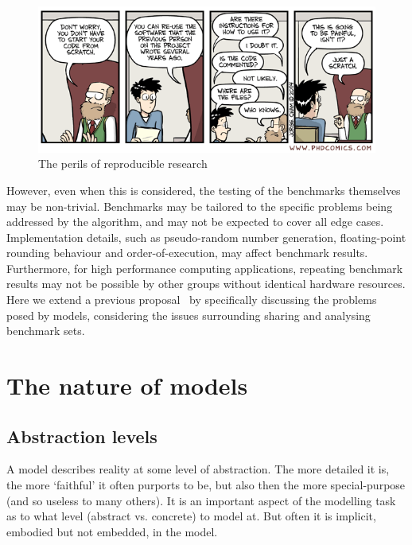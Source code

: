 \documentclass[conference]{IEEEtran}
\begin{document}
\begin{figure}[!ht]
\centering
\includegraphics[width=\columnwidth]{phd031214s.png}
\caption{The perils of reproducible research\newline [credit: \url{http://www.phdcomics.com/comics.php?f=1689}]}
\label{fig:reprodres} 
\end{figure}

However, even when this is considered, the testing of the benchmarks
themselves may be non-trivial. Benchmarks may be tailored to the
specific problems being addressed by the algorithm, and may not be
expected to cover all edge cases. Implementation details, such as
pseudo-random number generation, floating-point rounding behaviour and
order-of-execution, may affect benchmark results. Furthermore, for
high performance computing applications, repeating benchmark results
may not be possible by other groups without identical hardware
resources. Here we extend a previous
proposal~\cite{crick-et-al_wssspe2} by specifically discussing the
problems posed by models, considering the issues surrounding sharing
and analysing benchmark sets.


\section{The nature of models}

\subsection{Abstraction levels} 

A model describes reality at some level of abstraction. The more
detailed it is, the more `faithful' it often purports to be, but also
then the more special-purpose (and so useless to many others). It is
an important aspect of the modelling task as to what level (abstract
vs. concrete) to model at. But often it is implicit, embodied but not
embedded, in the model.
\end{document}
